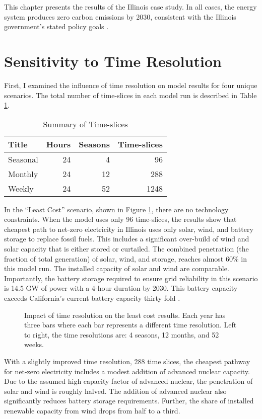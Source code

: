 This chapter presents the results of the Illinois case study. In all cases, the
energy system produces zero carbon emissions by 2030, consistent with the Illinois
government's stated policy goals
\cite{harmon_climate_2021,office_of_governor_jb_pritzker_gov_2021}.
\section{Sensitivity to Time Resolution}
\label{section:time_res}

First, I examined the influence of time resolution on model results for four
unique scenarios. The total number of time-slices in each model run is
described in Table \ref{tab:time-slices}.

\begin{table}[H]
  \centering
  \caption{Summary of Time-slices}
  \label{tab:time-slices}
  \begin{tabular}{lrrr}
    \toprule
    Title & Hours & Seasons & Time-slices \\
    \midrule
    Seasonal & 24 & 4 & 96\\
    Monthly & 24 & 12 & 288\\
    Weekly & 24 & 52 & 1248\\
    \bottomrule
  \end{tabular}
\end{table}
In the ``Least Cost'' scenario, shown in Figure \ref{fig:time_res_LC},
there are no technology constraints. When the model uses only 96 time-slices,
the results show that cheapest path to net-zero electricity in Illinois uses
only solar, wind, and battery storage to replace fossil fuels. This includes
a significant over-build of wind and solar capacity that is either stored
or curtailed. The combined penetration (the fraction of total generation)
of solar, wind, and storage, reaches almost 60\% in this model run. The installed
capacity of solar and wind are comparable. Importantly, the battery storage
required to ensure grid reliability in this scenario is 14.5 GW of power with
a 4-hour duration by 2030. This battery capacity exceeds California's current
battery capacity thirty fold \cite{hutchins_us_2021}.

\begin{figure}[H]
  \centering
  \resizebox{0.95\columnwidth}{!}{}
  \caption{Impact of time resolution on the least cost results. Each year has three bars where
  each bar represents a different time resolution. Left to right, the time resolutions are: 4
  seasons, 12 months, and 52 weeks.}
  \label{fig:time_res_LC}
\end{figure}
With a slightly improved time resolution, 288 time slices, the cheapest pathway
for net-zero electricity includes a modest addition of advanced nuclear capacity.
Due to the assumed high capacity factor of advanced nuclear, the penetration of
solar and wind is roughly halved. The addition of advanced nuclear also significantly
reduces battery storage requirements. Further, the share of installed renewable
capacity from wind drops from half to a third.

